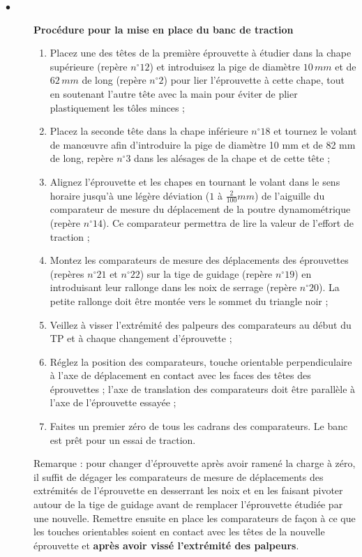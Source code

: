 \documentclass[lecture.tex]{subfiles}
\begin{document}
\begin{description}
\item[$\bullet$] \textbf{Procédure pour la mise en place du banc de traction}
\begin{enumerate}[label = \alph*)]
\item Placez une des têtes de la première éprouvette à étudier dans la chape supérieure (repère $n^{\circ}12$) et introduisez la pige de diamètre $10\, mm$ et de $62\, mm$ de long (repère $n^{\circ}2$) pour lier l'éprouvette à cette chape, tout en soutenant l'autre tête avec la main pour éviter de plier plastiquement les tôles minces ;
\item Placez la seconde tête dans la chape inférieure $n^{\circ}18$ et tournez le volant de manœuvre afin d'introduire la pige de diamètre 10 mm et de 82 mm de long, repère $n^{\circ}3$ dans les alésages de la chape et de cette tête ;
\item Alignez l'éprouvette et les chapes en tournant le volant dans le sens horaire jusqu'à une légère déviation ($1$ à $\frac{2}{100} mm$) de l'aiguille du comparateur de mesure du déplacement de la poutre dynamométrique (repère $n^{\circ}14$). Ce comparateur permettra de lire la valeur de l'effort de traction ;
\item Montez les comparateurs de mesure des déplacements des éprouvettes (repères $n^{\circ}21$ et $n^{\circ}22$) sur la tige de guidage (repère $n^{\circ}19$) en introduisant leur rallonge dans les noix de serrage (repère $n^{\circ}20$). La petite rallonge doit être montée vers le sommet du triangle noir ;
\item Veillez à visser l'extrémité des palpeurs des comparateurs au début du TP et à chaque changement d'éprouvette ;
\item Réglez la position des comparateurs, touche orientable perpendiculaire à l'axe de déplacement en contact avec les faces des têtes des éprouvettes ; l'axe de translation des comparateurs doit être parallèle à l'axe de l'éprouvette essayée ;
\item Faites un premier zéro de tous les cadrans des comparateurs. Le banc est prêt pour un essai de traction.
\end{enumerate}
\vspace{\baselineskip}

Remarque : pour changer d'éprouvette après avoir ramené la charge à zéro, il suffit de dégager les comparateurs de mesure de déplacements des extrémités de l'éprouvette en desserrant les noix et en les faisant pivoter autour de la tige de guidage avant de remplacer l'éprouvette étudiée par une nouvelle. Remettre ensuite en place les comparateurs de façon à ce que les touches orientables soient en contact avec les têtes de la nouvelle éprouvette et \textbf{après avoir vissé l'extrémité des palpeurs}.

\end{description}
\end{document}
